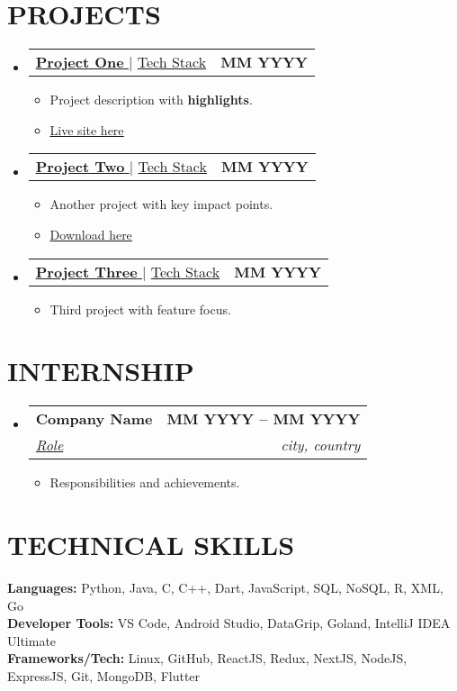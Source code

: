 \documentclass[letterpaper,11pt]{article}
\makeatletter
\newcommand{\resumeItem}[1]{\item\small{{#1 \vspace{-2pt}}}}
\newcommand{\resumeSubheading}[4]{
    \vspace{-2pt}\item
    \begin{tabular*}{1.0\textwidth}[t]{l@{\extracolsep{\fill}}r}
        \textbf{\large#1} & \textbf{\small #2} \\
        \textit{\large#3} & \textit{\small #4} \\
    \end{tabular*}\vspace{-7pt}
}
\newcommand{\resumeProjectHeading}[2]{
    \item
    \begin{tabular*}{1.001\textwidth}{l@{\extracolsep{\fill}}r}
        \small#1 & \textbf{\small #2}\\
    \end{tabular*}\vspace{-7pt}
}
\newcommand{\resumeItemListStart}{\begin{itemize}}
\newcommand{\resumeItemListEnd}{\end{itemize}\vspace{-5pt}}
\newcommand{\resumeSubHeadingListStart}{\begin{itemize}[leftmargin=0.0in, label={}]}
\newcommand{\resumeSubHeadingListEnd}{\end{itemize}}
\makeatother
\begin{document}
\section{PROJECTS}
\resumeSubHeadingListStart

\resumeProjectHeading
{\href{ProjectLink.com}{\textbf{\large{\underline{Project One}}} \raisebox{-0.1\height}\faIcon[solid]{external-link-alt}} $|$ \large{\underline{Tech Stack}}}{MM YYYY}
\resumeItemListStart
\resumeItem{Project description with \textbf{highlights}.}
\resumeItem{\textcolor{accent}{\href{Live Project Link}{\underline{Live site here}}}}
\resumeItemListEnd

\resumeProjectHeading
{\href{ProjectLink.com}{\textbf{\large{\underline{Project Two}}} \raisebox{-0.1\height}\faIcon[solid]{external-link-alt}} $|$ \large{\underline{Tech Stack}}}{MM YYYY}
\resumeItemListStart
\resumeItem{Another project with key impact points.}
\resumeItem{\textcolor{accent}{\href{DownloadLink.com}{\underline{Download here}}}}
\resumeItemListEnd

\resumeProjectHeading
{\href{ProjectLink.com}{\textbf{\large{\underline{Project Three}}} \raisebox{-0.1\height}\faIcon[solid]{external-link-alt}} $|$ \large{\underline{Tech Stack}}}{MM YYYY}
\resumeItemListStart
\resumeItem{Third project with feature focus.}
\resumeItemListEnd

\resumeSubHeadingListEnd

\section{INTERNSHIP}
\resumeSubHeadingListStart
\resumeSubheading
{Company Name \href{certificate Link}{\raisebox{-0.1\height}\faIcon[solid]{external-link-alt}}}{MM YYYY -- MM YYYY}
{\underline{Role}}{city, country}
\resumeItemListStart
\resumeItem{Responsibilities and achievements.}
\resumeItemListEnd
\resumeSubHeadingListEnd

\section{TECHNICAL SKILLS}
\begin{itemize}[leftmargin=0.15in, label={}]
\small{\item{
\textbf{Languages:} Python, Java, C, C++, Dart, JavaScript, SQL, NoSQL, R, XML, Go \\
\textbf{Developer Tools:} VS Code, Android Studio, DataGrip, Goland, IntelliJ IDEA Ultimate \\
\textbf{Frameworks/Tech:} Linux, GitHub, ReactJS, Redux, NextJS, NodeJS, ExpressJS, Git, MongoDB, Flutter
}}
\end{itemize}
\end{document}
